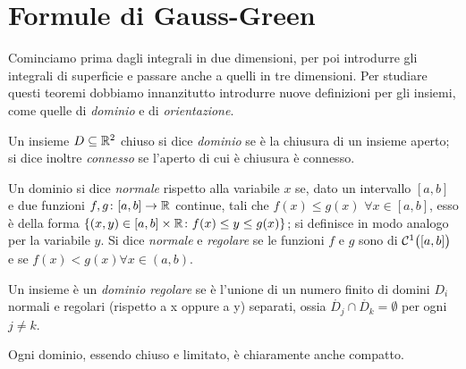 \section{Formule di Gauss-Green}
Cominciamo prima dagli integrali in due dimensioni, per poi introdurre gli integrali di superficie e passare anche a quelli in tre dimensioni.
Per studiare questi teoremi dobbiamo innanzitutto introdurre nuove definizioni per gli insiemi, come quelle di \emph{dominio} e di \emph{orientazione}.
\begin{definizione} \label{d:dominio}
	Un insieme $D\subseteq\mathbb{R}^2$ chiuso si dice \emph{dominio} se è la chiusura di un insieme aperto; si dice inoltre \emph{connesso} se l'aperto di cui è chiusura è connesso.
\end{definizione}
\begin{definizione} \label{d:dominio-norm-reg}
	Un dominio si dice \emph{normale} rispetto alla variabile $x$ se, dato un intervallo $[a,b]$ e due funzioni $f,g\colon[a,b]\to\mathbb{R}$ continue, tali che $f(x)\leq g(x)$ $\forall x\in[a,b]$, esso è della forma $\{(x,y)\in[a,b]\times\mathbb{R}\colon f(x)\leq y\leq g(x)\}$; si definisce in modo analogo per la variabile $y$.
	Si dice \emph{normale} e \emph{regolare} se le funzioni $f$ e $g$ sono di $\mathcal{C}^{{1}}\big([a,b]\big)$ e se $f(x)<g(x) \forall x\in(a,b)$.
\end{definizione}
\begin{definizione} \label{d:dominio-regolare}
	Un insieme è un \emph{dominio regolare} se è l'unione di un numero finito di domini $D_i$ normali e regolari (rispetto a x oppure a y) separati, ossia $\mathring{D_j}\cap\mathring{D_k}=\emptyset$ per ogni $j\neq k$.
\end{definizione}
Ogni dominio, essendo chiuso e limitato, è chiaramente anche compatto.

